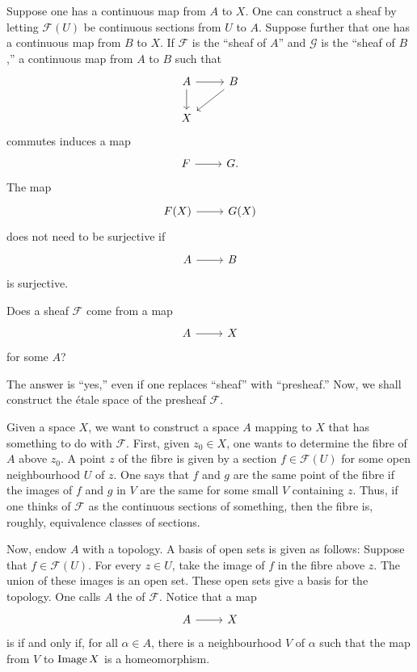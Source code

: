 \documentclass [11 pt, oneside] {article}
\begin{document}
Suppose one has a continuous map from $A$ to $X$. One can construct a sheaf by letting $\mathscr{F}(U)$ be continuous sections from $U$ to $A$. Suppose further that one has a continuous map from $B$ to $X$. If $\mathscr{F}$ is the ``sheaf of $A$'' and $\mathscr{G}$ is the ``sheaf of $B$,'' a continuous map from $A$ to $B$ such that
\[
\begin{tikzcd}
	A \ar[d]\ar[r] &B\ar[dl]\\X
\end{tikzcd}
\]
commutes induces a map 
\[
\begin{tikzcd}
\mathscr{F}\ar[r]& \mathscr{G}.
\end{tikzcd}
\]
The map 
\[
\begin{tikzcd}
\mathscr{F}(X) \ar[r]& \mathscr{G}(X)
\end{tikzcd}
\]
does not need to be surjective if
\[
\begin{tikzcd}
A\ar[r]&B
\end{tikzcd}
\]
is surjective.

\begin{problem}
	Does a sheaf $\mathscr{F}$ come from a map
	\[
\begin{tikzcd}
A\ar[r]&X
\end{tikzcd}
\]
	for some $A$?
\end{problem}

The answer is ``yes,'' even if one replaces ``sheaf'' with ``presheaf.'' Now, we shall construct the \'etale space of the presheaf $\mathscr{F}$. 

Given a space $X$, we want to construct a space $A$ mapping to $X$ that has something to do with $\mathscr{F}$. First, given $z_0 \in X$, one wants to determine the fibre of $A$ above $z_0$. A point $z$ of the fibre is given by a section $f\in \mathscr{F}(U)$ for some open neighbourhood $U$ of $z$. One says that $f$ and $g$ are the same point of the fibre if the images of $f$ and $g$ in $V$ are the same for some small $V$ containing $z$. Thus, if one thinks of $\mathscr{F}$ as the continuous sections of something, then the fibre is, roughly, equivalence classes of sections.

Now, endow $A$ with a topology. A basis of open sets is given as follows: Suppose that $f\in \mathscr{F}(U)$. For every $z\in U$, take the image of $f$ in the fibre above $z$. The union of these images is an open set. These open sets give a basis for the topology. One calls $A$ the  of $\mathscr{F}$. Notice that a map 
\[
\begin{tikzcd}
A\ar[r]&X
\end{tikzcd}
\]
is  if and only if, for all $\alpha\in A$, there is a neighbourhood $V$ of $\alpha$ such that the map from $V$ to $\operatorname{Image} X$ is a homeomorphism.
\end{document}
